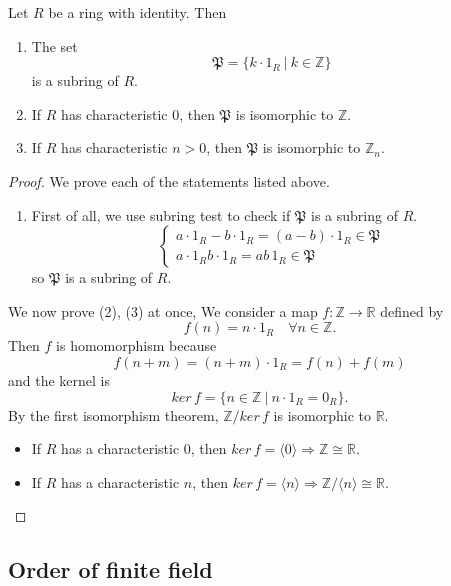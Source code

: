 \begin{theorem}
    Let $R$ be a ring with identity. Then 
    \begin{enumerate}
        \item The set 
        \[
            \mathfrak{P} = \{ k \cdot 1_R \> | \> k \in \mathbb{Z} \}
        \]
         is a subring of $R$.
        \item If $R$ has characteristic $0$, then $\mathfrak{P}$ is isomorphic to $\mathbb{Z}$.
        \item If $R$ has characteristic $n > 0$, then $\mathfrak{P}$ is isomorphic to $\mathbb{Z}_n$.
    \end{enumerate}
\end{theorem}
\begin{proof}
    We prove each of the statements listed above.
    \begin{enumerate}
        \item First of all, we use subring test to check if $\mathfrak{P}$ is a subring of $R$.
        \[
            \begin{cases}
                a \cdot 1_R - b \cdot 1_R = (a-b) \cdot 1_R \in \mathfrak{P}\\
                a \cdot 1_R b \cdot 1_R = ab\, 1_R \in \mathfrak{P}
            \end{cases}
        \]
        so $\mathfrak{P}$ is a subring of $R$. 
    \end{enumerate}

    We now prove (2), (3) at once, We consider a map $f : \mathbb{Z} \to \mathbb{R}$ 
    defined by 
    \[
        f(n) = n \cdot 1_R \quad \forall n \in \mathbb{Z}.
    \] 
    Then $f$ is homomorphism because 
    \[
        f(n + m) = (n + m) \cdot 1_R = f(n) + f(m)
    \]
    and the kernel is 
    \[
        ker\, f = \{ n \in \mathbb{Z} \> | \> n \cdot 1_R = 0_R \}.
    \]
    By the first isomorphism theorem, $\mathbb{Z} / ker\, f$ is isomorphic to $\mathbb{R}$.
    \begin{itemize}
        \item If $R$ has a characteristic $0$, then $ker\, f = \langle 0 \rangle \Longrightarrow \mathbb{Z} \cong \mathbb{R}$.
        \item If $R$ has a characteristic $n$, then $ker\, f = \langle n \rangle \Longrightarrow \mathbb{Z}/\langle n \rangle \cong \mathbb{R}$.
    \end{itemize}
\end{proof}

\subsection{Order of finite field}

